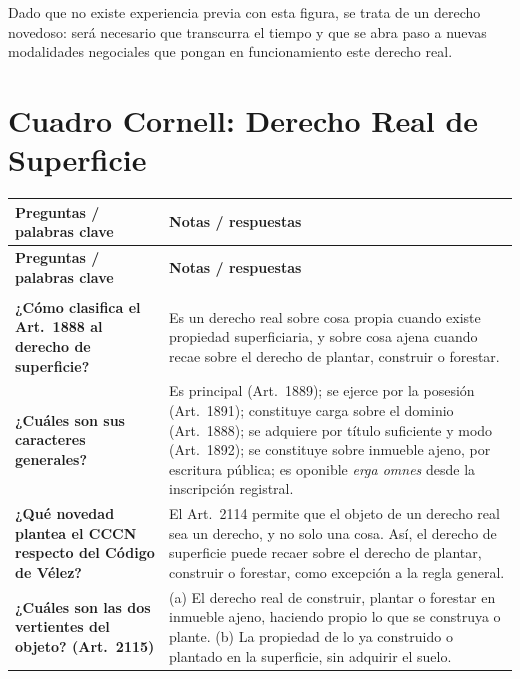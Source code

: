 \documentclass[12pt,oneside]{book}
\begin{document}
\begin{note}
Dado que no existe experiencia previa con esta figura, se trata de un derecho novedoso: será necesario que transcurra el tiempo y que se abra paso a nuevas modalidades negociales que pongan en funcionamiento este derecho real.
\end{note}

\chapter[Cuadro Cornell]{Cuadro Cornell: Derecho Real de Superficie}

\renewcommand{\arraystretch}{1.25}
\begin{longtable}{
    >{\raggedright\arraybackslash}p{}
    >{\raggedright\arraybackslash}p{}
}
\toprule
\textbf{Preguntas / palabras clave} &
\textbf{Notas / respuestas} \\
\midrule
\endfirsthead
\toprule
\textbf{Preguntas / palabras clave} &
\textbf{Notas / respuestas} \\
\midrule
\endhead
\midrule
\multicolumn{2}{r}{\small\textit{Continúa en la página siguiente}} \\
\endfoot
\endlastfoot

\textbf{¿Cómo clasifica el Art.~1888 al derecho de superficie?} &
Es un derecho real sobre cosa propia cuando existe propiedad superficiaria, y sobre cosa ajena cuando recae sobre el derecho de plantar, construir o forestar. \\[0.6em]

\textbf{¿Cuáles son sus caracteres generales?} &
Es principal (Art.~1889); se ejerce por la posesión (Art.~1891); constituye carga sobre el dominio (Art.~1888); se adquiere por título suficiente y modo (Art.~1892); se constituye sobre inmueble ajeno, por escritura pública; es oponible \textit{erga omnes} desde la inscripción registral. \\[0.6em]

\textbf{¿Qué novedad plantea el CCCN respecto del Código de Vélez?} &
El Art.~2114 permite que el objeto de un derecho real sea un derecho, y no solo una cosa. Así, el derecho de superficie puede recaer sobre el derecho de plantar, construir o forestar, como excepción a la regla general. \\[0.6em]

\textbf{¿Cuáles son las dos vertientes del objeto? (Art.~2115)} &
(a) El derecho real de construir, plantar o forestar en inmueble ajeno, haciendo propio lo que se construya o plante. (b) La propiedad de lo ya construido o plantado en la superficie, sin adquirir el suelo. \\[0.6em]


\end{longtable}
\end{document}
